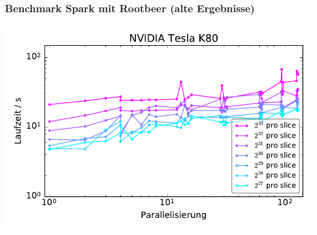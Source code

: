 \begin{frame}
    \frametitle{Benchmark Spark mit Rootbeer (alte Ergebnisse)}
    \centerline{\includegraphics[width=0.9\linewidth]{cluster-strong-scaling-gpu.pdf}}
\end{frame}



